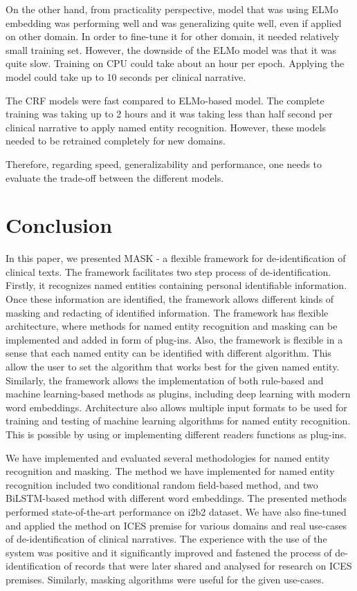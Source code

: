 \documentclass[a4paper,twoside]{article}
\begin{document}
On the other hand, from practicality perspective, model that was using ELMo embedding was performing well and was generalizing quite well, even if applied on other domain. In order to fine-tune it for other domain, it needed relatively small training set. However, the downside of the ELMo model was that it was quite slow. Training on CPU could take about an hour per epoch. Applying the model could take up to 10 seconds per clinical narrative. 

The CRF models were fast compared to ELMo-based model. The complete training was taking up to 2 hours and it was taking less than half second per clinical narrative to apply named entity recognition. However, these models needed to be retrained completely for new domains. 

Therefore, regarding speed, generalizability and performance, one needs to evaluate the trade-off between the different models. 



\section{Conclusion}

In this paper, we presented MASK - a flexible framework for de-identification of clinical texts. The framework facilitates two step process of de-identification. Firstly, it recognizes named entities containing personal identifiable information. Once these information are identified, the framework allows different kinds of masking and redacting of identified information. The framework has flexible architecture, where methods for named entity recognition and masking can be implemented and added in form of plug-ins. Also, the framework is flexible in a sense that each named entity can be identified with different algorithm. This allow the user to set the algorithm that works best for the given named entity. Similarly, the framework allows the implementation of both rule-based and machine learning-based methods as plugins, including deep learning with modern word embeddings. Architecture also allows multiple input formats to be used for training and testing of machine learning algorithms for named entity recognition. This is possible by using or implementing different readers functions as plug-ins. 

We have implemented and evaluated several methodologies for named entity recognition and masking. The method we have implemented for named entity recognition included two conditional random field-based method, and two BiLSTM-based method with different word embeddings. The presented methods performed state-of-the-art performance on i2b2 dataset. We have also fine-tuned and applied the method on ICES premise for various domains and real use-cases of de-identification of clinical narratives. The experience with the use of the system was positive and it significantly improved and fastened the process of de-identification of records that were later shared and analysed for research on ICES premises. Similarly, masking algorithms were useful  for the given use-cases. 
\end{document}
